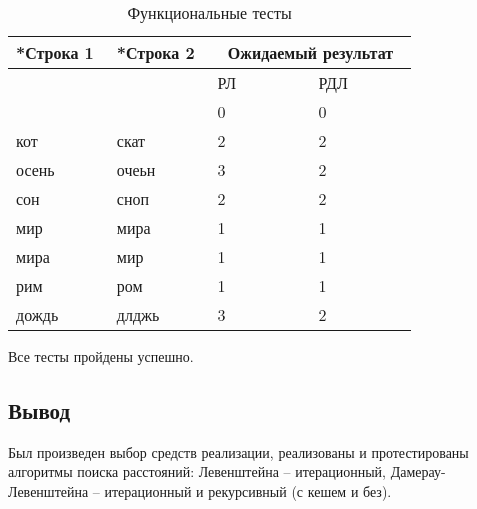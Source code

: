 \begin{table}[h]
    \captionsetup{justification=ragged_right}
	\begin{center}
	    \begin{threeparttable}
	    \captionsetup{justification=raggedright, singlelinecheck=off}
		\caption{\label{test} Функциональные тесты}
		\begin{tabular}{|>{\centering}p{0.2\linewidth}|>{\centering}p{0.2\linewidth}|p{0.2\linewidth}<{\centering}|p{0.2\linewidth}<{\centering}|}
			\hline
			\multirow{2}*{Строка 1} & \multirow{2}*{Строка 2} & \multicolumn{2}{c|}{Ожидаемый результат} \\ \cline{3-4}
			& & РЛ & РДЛ \\ 
			\hline
			 &  & 0 & 0 \\
			\hline
			кот & скат & 2 & 2 \\
			\hline
			осень & очеьн & 3 & 2 \\
			\hline
			сон & сноп & 2 & 2 \\
			\hline
			мир & мира & 1 & 1 \\
			\hline
			мира & мир & 1 & 1 \\
			\hline
			рим & ром & 1 & 1 \\
			\hline
			дождь & длджь & 3 & 2 \\
			\hline
		\end{tabular}
		\end{threeparttable}
	\end{center}
\end{table}
Все тесты пройдены успешно.

\subsection*{Вывод}

Был произведен выбор средств реализации, реализованы и протестированы алгоритмы поиска расстояний: Левенштейна -- итерационный, Дамерау-Левенштейна -- итерационный и рекурсивный (с кешем и без).